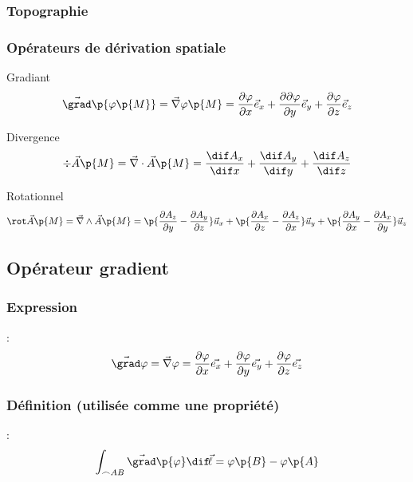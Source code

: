    \subsubsection{Topographie}
    
    \subsubsection{Opérateurs de dérivation spatiale}
    
    \begin{definition}{Gradiant}{}
        \[ \vec{\grad}\p{\varphi\p{M}} = \vec{\nabla}\varphi\p{M} = \dfrac{\partial \varphi}{\partial x}\vec{e}_x + \dfrac{\partial \partial \varphi}{\partial y}\vec{e}_y + \dfrac{\partial \varphi}{\partial z}\vec{e}_z \]
    \end{definition}
    
    \begin{definition}{Divergence}{}
        \[ \div\vec{A}\p{M} = \vec{\nabla} \cdot \vec{A}\p{M} = \dfrac{\dif A_x}{\dif x} + \dfrac{\dif A_y}{\dif y} + \dfrac{\dif A_z}{\dif z} \]
    \end{definition}
    
    \begin{definition}{Rotationnel}{}
        \[ \rot\vec{A}\p{M} = \vec{\nabla} \land \vec{A}\p{M} = \p{\dfrac{\partial A_z}{\partial y} - \dfrac{\partial A_y}{\partial z}}\vec{u}_x + \p{\dfrac{\partial A_x}{\partial z} - \dfrac{\partial A_z}{\partial x}}\vec{u}_y + \p{\dfrac{\partial A_y}{\partial x} - \dfrac{\partial A_x}{\partial y}}\vec{u}_z \]
    \end{definition}
    
    \subsection{Opérateur gradient}
    
    \subsubsection{Expression} :
    \[ \vec{\grad} \varphi = \vec{\nabla} \varphi = \dfrac{\partial \varphi}{\partial x} \vec{e_x} + \dfrac{\partial \varphi}{\partial y} \vec{e_y} +
    \dfrac{\partial \varphi}{\partial z} \vec{e_z}\]
    \subsubsection{Définition (utilisée comme une propriété)} :
    \[ \int_{\frown{AB}} \vec{\grad}\p{\varphi}  \dif\! \Vec{\ell} = \varphi\p{B} - \varphi\p{A}\]
    
